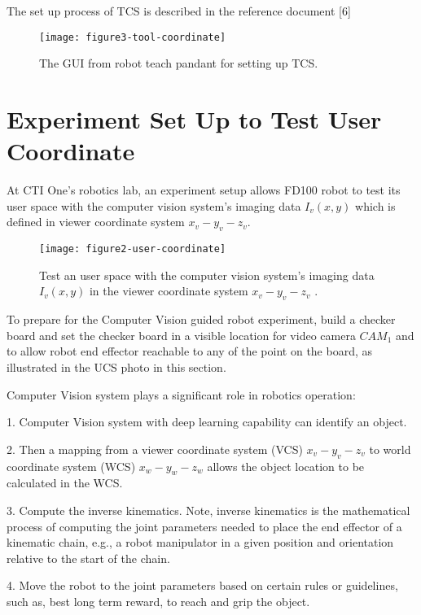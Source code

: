 \documentclass[conference]{IEEEtran}
\begin{document}
The set up process of TCS is described in the reference
document [6] 

\begin{figure}[H] 
\centering
\texttt{[image: figure3-tool-coordinate]}  
\caption{The GUI from robot teach pandant for setting up TCS.}
\label{figure3-tool-coordinate} 
\end{figure}

\section{Experiment Set Up to Test User Coordinate}
At CTI One's robotics lab, an experiment setup
allows FD100 robot to test its user space with the 
computer vision system's imaging data $I_v(x,y)$ 
which is defined in viewer coordinate system 
$x_v-y_v-z_v$. 
\begin{figure}[H] 
\centering
\texttt{[image: figure2-user-coordinate]}  
\caption{Test an user space with the 
computer vision system's imaging data $I_v(x,y)$ 
in the viewer coordinate system 
$x_v-y_v-z_v$ .}
\label{figure2-user-coordinate} 
\end{figure}

To prepare for the Computer Vision guided robot experiment, 
build a checker board and set the checker board in 
a visible location for video camera $CAM_1$ and to allow robot 
end effector reachable 
to any of the point on the board, as illustrated in the 
UCS photo in this section. 

Computer Vision system plays a significant role in 
robotics operation: 

1. Computer Vision system with deep learning capability can 
identify an object. 

2. Then a mapping from a viewer coordinate system (VCS) $x_v-y_v-z_v$
to world coordinate system (WCS) $x_w-y_w-z_w$ allows the 
object location to be calculated in the WCS.  

3. Compute the 
inverse kinematics. Note, inverse kinematics is the mathematical 
process of computing the joint parameters needed to place the end 
effector of a kinematic chain, e.g., a robot manipulator
in a given position and orientation relative to the start of the 
chain. 

4. Move the robot to the joint parameters based on certain
rules or guidelines, such as, best long term reward, to reach and 
grip the object. 
\end{document}
